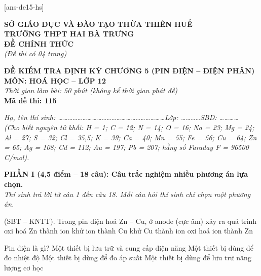 \documentclass[11pt,a4paper]{article}
\def\loigiai#1{}
\begin{document}
[ans-de15-hs]

\noindent
\begin{minipage}[t]{0.48\textwidth}
	\textbf{SỞ GIÁO DỤC VÀ ĐÀO TẠO THỪA THIÊN HUẾ}\\
	\textbf{TRƯỜNG THPT HAI BÀ TRƯNG}\\
	\textbf{ĐỀ CHÍNH THỨC}\\
	\textit{(Đề thi có 04 trang)}
\end{minipage}\hfill
\begin{minipage}[t]{0.48\textwidth}
	\raggedleft
	\textbf{\color{mainGreen}ĐỀ KIỂM TRA ĐỊNH KỲ CHƯƠNG 5 (PIN ĐIỆN – ĐIỆN PHÂN)}\\
	\textbf{MÔN: HOÁ HỌC -- LỚP 12}\\
	\textit{Thời gian làm bài: 50 phút (không kể thời gian phát đề)}\\
	\textbf{Mã đề thi: 115}
\end{minipage}


\vspace{1pt}
\noindent\textit{Họ, tên thí sinh: \dots\dots\dots\dots\dots\dots\dots\dots\dots\dots\dots\dots\dots\dots\dots\dots\dots\dots\dots\dots\dots\dots Lớp: \dots\dots\dots\dots SBD: \dots\dots\dots\dots}\\
\noindent\textit{(Cho biết nguyên tử khối: H = 1; C = 12; N = 14; O = 16; Na = 23; Mg = 24; Al = 27; S = 32; Cl = 35,5; K = 39; Ca = 40; Mn = 55; Fe = 56; Cu = 64; Zn = 65; Ag = 108; Cd = 112; Au = 197; Pb = 207; hằng số Faraday F = 96500 C/mol).}

\vspace{2pt}
\noindent
\textbf{PHẦN I (4,5 điểm -- 18 câu): Câu trắc nghiệm nhiều phương án lựa chọn.}\\
\textit{Thí sinh trả lời từ câu 1 đến câu 18. Mỗi câu hỏi thí sinh chỉ chọn một phương án.}

\setcounter{ex}{0}

\begin{ex}
(SBT – KNTT). Trong pin điện hoá Zn -- Cu, ở anode (cực âm) xảy ra quá trình
\choice
{oxi hoá Zn thành ion }
{khử ion  thành Cu}
{khử Cu thành ion }
{oxi hoá ion  thành Zn}
\loigiai{}
\end{ex}

\begin{ex}
Pin điện là gì?
\choice
{Một thiết bị lưu trữ và cung cấp điện năng}
{Một thiết bị dùng để đo nhiệt độ}
{Một thiết bị dùng để đo áp suất}
{Một thiết bị dùng để lưu trữ năng lượng cơ học}
\loigiai{}
\end{ex}
\end{document}
